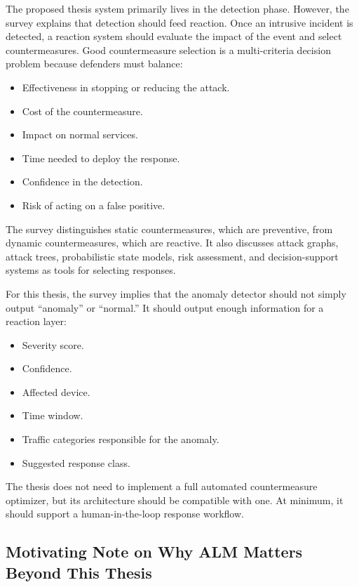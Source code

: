 \documentclass[11pt,a4paper]{article}
\begin{document}
The proposed thesis system primarily lives in the detection phase. However, the survey explains that detection should feed reaction. Once an intrusive incident is detected, a reaction system should evaluate the impact of the event and select countermeasures. Good countermeasure selection is a multi-criteria decision problem because defenders must balance:

\begin{itemize}
  \item Effectiveness in stopping or reducing the attack.
  \item Cost of the countermeasure.
  \item Impact on normal services.
  \item Time needed to deploy the response.
  \item Confidence in the detection.
  \item Risk of acting on a false positive.
\end{itemize}

The survey distinguishes static countermeasures, which are preventive, from dynamic countermeasures, which are reactive. It also discusses attack graphs, attack trees, probabilistic state models, risk assessment, and decision-support systems as tools for selecting responses.

For this thesis, the survey implies that the anomaly detector should not simply output ``anomaly'' or ``normal.'' It should output enough information for a reaction layer:

\begin{itemize}
  \item Severity score.
  \item Confidence.
  \item Affected device.
  \item Time window.
  \item Traffic categories responsible for the anomaly.
  \item Suggested response class.
\end{itemize}

The thesis does not need to implement a full automated countermeasure optimizer, but its architecture should be compatible with one. At minimum, it should support a human-in-the-loop response workflow.

\subsection{Motivating Note on Why ALM Matters Beyond This Thesis}
\end{document}
